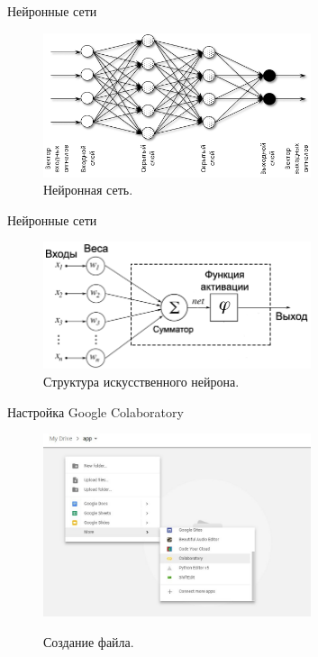 \documentclass{beamer}
\begin{document}
\begin{frame}{Нейронные сети}
\begin{figure}[h]
    \centering
  \includegraphics[width=0.7\textwidth]{nn_vizualisation.png}
  \caption{Нейронная сеть.}
  \label{fig:neuron}
\end{figure}
\end{frame}




\begin{frame}{Нейронные сети}
\begin{figure}[h]
    \centering
  \includegraphics[width=0.7\textwidth]{nuron_model.png}
  \caption{Структура искусственного нейрона.}
  \label{fig:neuron}
\end{figure}
\end{frame}








\begin{frame}{Настройка Google Colaboratory}
\begin{figure}[h]
  \centering
  \includegraphics[width=0.7\textwidth]{colab_settings_1.jpeg} \\
  \caption{Создание файла.}
\end{figure}
\end{frame}
\end{document}
